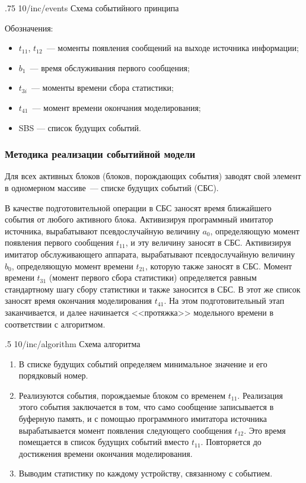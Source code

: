 \image
{.75\textwidth}
{10/inc/events}
{Схема событийного принципа}

Обозначения:

\begin{itemize}
    \item $t_{11}$, $t_{12}$~--- моменты появления сообщений на выходе источника информации;
    \item $b_1$~--- время обслуживания первого сообщения;
    \item $t_{3i}$~--- моменты времени сбора статистики;
    \item $t_{41}$~--- момент времени окончания моделирования;
    \item SBS --- список будущих событий.
\end{itemize}

\subsubsection{Методика реализации событийной модели}

Для всех активных блоков (блоков, порождающих события) заводят свой элемент
в одномерном массиве~--- списке будущих событий (СБС).

В качестве подготовительной операции в СБС заносят время ближайшего события от любого активного блока. Активизируя программный имитатор источника, вырабатывают псевдослучайную величину $a_0$, определяющую момент появления первого сообщения $t_{11}$, и эту величину заносят в СБС. Активизируя имитатор обслуживающего аппарата, вырабатывают псевдослучайную величину $b_0$, определяющую момент времени $t_{21}$, которую также заносят в СБС. Момент времени $t_{31}$ (момент первого сбора статистики) определяется равным стандартному шагу сбору статистики и также заносится в СБС. В этот же список заносят время окончания моделирования $t_{41}$. На этом подготовительный этап заканчивается, и далее начинается <<протяжка>> модельного времени в соответствии с алгоритмом.

\image
{.5\textwidth}
{10/inc/algorithm}
{Схема алгоритма}

\begin{enumerate}
    \item В списке будущих событий определяем минимальное значение и его порядковый номер.
    \item Реализуются события, порождаемые блоком со временем $t_{11}$. Реализация этого события заключается в том, что само сообщение записывается в буферную память, и с помощью программного имитатора источника вырабатывается момент появления следующего сообщения $t_{12}$. Это время помещается в список будущих событий вместо $t_{11}$. Повторяется до достижения времени окончания моделирования.
    \item Выводим статистику по каждому устройству, связанному с событием.
\end{enumerate}

